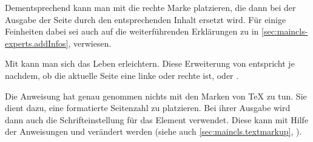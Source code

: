   Dementsprechend kann man mit 
  die rechte Marke platzieren, die dann bei der Ausgabe der Seite durch den
  entsprechenden Inhalt ersetzt wird. Für einige Feinheiten dabei sei auch
  auf die weiterführenden Erklärungen zu
   in
  \autoref{sec:maincls-experts.addInfos},
   verwiesen.

  Mit  kann man sich das Leben
  erleichtern. Diese Erweiterung von
   entspricht je nachdem, ob die aktuelle Seite eine linke oder rechte ist,
   oder .

  Die Anweisung  hat genau
  genommen nichts mit den Marken von \TeX{} zu tun. Sie dient dazu, eine
  formatierte Seitenzahl zu platzieren.
  Bei ihrer Ausgabe wird dann auch die Schrifteinstellung für das Element
  verwendet. Diese kann mit Hilfe der Anweisungen
   und 
  verändert werden (siehe auch \autoref{sec:maincls.textmarkup},
  ).%
